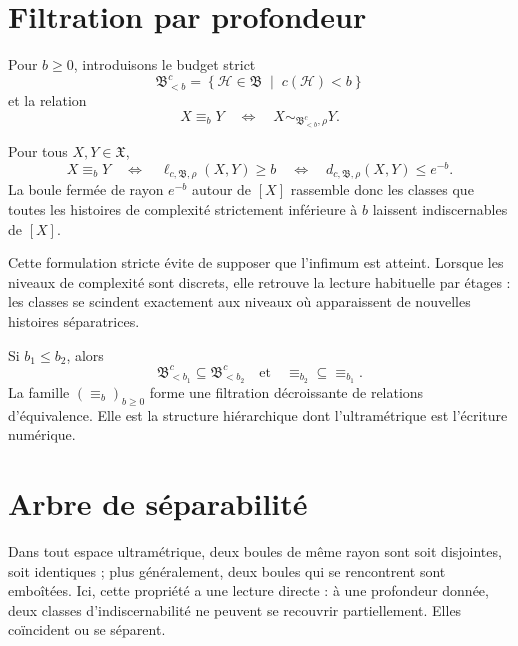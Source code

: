 \section{Filtration par profondeur}
\label{annexe-L-filtration}

Pour \(b\geq0\), introduisons le budget strict
\[
\mathfrak B_{<b}^{c}
=
\left\{
\mathcal H\in\mathfrak B
\;\middle|\;
c(\mathcal H)<b
\right\}
\]
et la relation
\[
X\equiv_bY
\quad\Longleftrightarrow\quad
X\sim_{\mathfrak B_{<b}^{c},\rho}Y.
\]

\begin{encadre}[title={Corollaire \theproposition{} --- Boules et budgets}]
Pour tous \(X,Y\in\mathfrak X\),
\begin{equation}
\label{eq:annexe-L-boules}
\boxed{
X\equiv_bY
\quad\Longleftrightarrow\quad
\ell_{c,\mathfrak B,\rho}(X,Y)\geq b
\quad\Longleftrightarrow\quad
d_{c,\mathfrak B,\rho}(X,Y)\leq e^{-b}.
}
\end{equation}
La boule fermée de rayon \(e^{-b}\) autour de \([X]\) rassemble donc les
classes que toutes les histoires de complexité strictement inférieure à
\(b\) laissent indiscernables de \([X]\).
\end{encadre}

Cette formulation stricte évite de supposer que l'infimum est atteint.
Lorsque les niveaux de complexité sont discrets, elle retrouve la lecture
habituelle par étages : les classes se scindent exactement aux niveaux
où apparaissent de nouvelles histoires séparatrices.

Si \(b_1\leq b_2\), alors
\[
\mathfrak B_{<b_1}^{c}
\subseteq
\mathfrak B_{<b_2}^{c}
\quad\text{et}\quad
\equiv_{b_2}
\subseteq
\equiv_{b_1}.
\]
La famille \((\equiv_b)_{b\geq0}\) forme une filtration décroissante de
relations d'équivalence. Elle est la structure hiérarchique dont
l'ultramétrique est l'écriture numérique.

\section{Arbre de séparabilité}
\label{annexe-L-arbre}

Dans tout espace ultramétrique, deux boules de même rayon sont soit
disjointes, soit identiques ; plus généralement, deux boules qui se
rencontrent sont emboîtées. Ici, cette propriété a une lecture directe :
à une profondeur donnée, deux classes d'indiscernabilité ne peuvent se
recouvrir partiellement. Elles coïncident ou se séparent.

